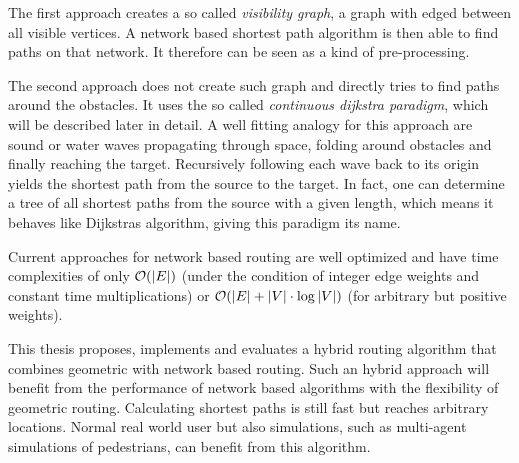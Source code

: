 The first approach creates a so called \textit{visibility graph}, a graph with edged between all visible vertices\citationNeeded.
A network based shortest path algorithm is then able to find paths on that network.
It therefore can be seen as a kind of pre-processing.

The second approach does not create such graph and directly tries to find paths around the obstacles.
It uses the so called \textit{continuous dijkstra paradigm}, which will be described later in detail.
A well fitting analogy for this approach are sound or water waves propagating through space, folding around obstacles and finally reaching the target.
Recursively following each wave back to its origin yields the shortest path from the source to the target\citationNeeded.
In fact, one can determine a tree of all shortest paths from the source with a given length, which means it behaves like Dijkstras algorithm, giving this paradigm its name.

Current approaches for network based routing are well optimized and have time complexities of only $\mathcal{O}(|E|)$ (under the condition of integer edge weights and constant time multiplications) or $\mathcal{O}(|E| + |V| \cdot \log{|V|})$ (for arbitrary but positive weights)\citationNeeded.

This thesis proposes, implements and evaluates a hybrid routing algorithm that combines geometric with network based routing.
Such an hybrid approach will benefit from the performance of network based algorithms with the flexibility of geometric routing.
Calculating shortest paths is still fast but reaches arbitrary locations.
Normal real world user but also simulations, such as multi-agent simulations of pedestrians, can benefit from this algorithm.